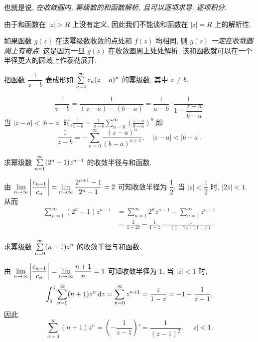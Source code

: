 也就是说, \emph{在收敛圆内, 幂级数的和函数解析, 且可以逐项求导, 逐项积分}.

由于和函数在 $|z|>R$ 上没有定义, 因此我们不能谈和函数在 $|z|=R$ 上的解析性.

如果函数 $g(z)$ 在该幂级数收敛的点处和 $f(z)$ 均相同, 则 $g(z)$ \emph{一定在收敛圆周上有奇点}.
这是因为一旦 $g(z)$ 在收敛圆周上处处解析, 该和函数就可以在一个半径更大的圆域上作泰勒展开.

\begin{example}
	把函数 $\dfrac1{z-b}$ 表成形如 $\sum\limits_{n=0}^\infty c_n(z-a)^n$ 的幂级数, 其中 $a\neq b$.
\end{example}

\begin{solution}
	\[\frac1{z-b}=\frac1{(z-a)-(b-a)}
	{=\frac1{a-b}\cdot\frac1{1-\dfrac{z-a}{b-a}}.}\]
	{当 $|z-a|<|b-a|$ 时,$\displaystyle\frac1{z-b}=\frac1{a-b}\sum_{n=0}^\infty\left(\frac{z-a}{b-a}\right)^n$,即
	\[\frac1{z-b}=-\sum_{n=0}^\infty\frac{(z-a)^n}{(b-a)^{n+1}},\quad|z-a|<|b-a|.\]}
\end{solution}

\begin{example}
	求幂级数 $\sum\limits_{n=1}^\infty(2^n-1)z^{n-1}$ 的收敛半径与和函数.
\end{example}

\begin{solution}
	由 $\displaystyle\lim_{n\to\infty}\left|\frac{c_{n+1}}{c_n}\right|=\lim_{n\to\infty}\frac{2^{n+1}-1}{2^n-1}=2$ 可知收敛半径为 $\dfrac12$.
	{当 $|z|<\dfrac12$ 时, $|2z|<1$.}
	{从而
	\begin{align*}
	\sum_{n=1}^\infty(2^n-1)z^{n-1}&=\sum_{n=1}^\infty 2^n z^{n-1}-\sum_{n=1}^\infty z^{n-1}\\
	&{=\frac2{1-2z}-\frac1{1-z}=\frac1{(1-2z)(1-z)}.}
	\end{align*}}
\end{solution}

\begin{example}
	求幂级数 $\sum\limits_{n=0}^\infty(n+1)z^n$ 的收敛半径与和函数.
\end{example}

\begin{solution}
	由 $\displaystyle\lim_{n\to\infty}\left|\frac{c_{n+1}}{c_n}\right|=\lim_{n\to\infty}\frac{n+1}n=1$ 可知收敛半径为 $1$.
{当 $|z|<1$ 时,
	\[\int_0^z\sum_{n=0}^\infty(n+1)z^n\,\mathrm{d} z=\sum_{n=0}^\infty z^{n+1}=\frac z{1-z}=-1-\frac1{z-1},\]
}{因此
	\[\sum_{n=0}^\infty(n+1)z^n=\left(-\frac1{z-1}\right)'=\frac1{(z-1)^2},\quad |z|<1.\]}
\end{solution}

